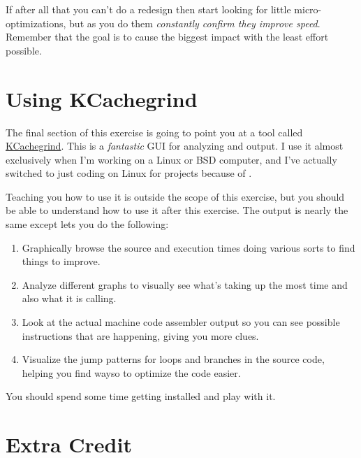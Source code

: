If after all that you can't do a redesign then start looking for little
micro-optimizations, but as you do them \emph{constantly confirm they
improve speed}.  Remember that the goal is to cause the biggest impact
with the least effort possible.

\section{Using KCachegrind}

The final section of this exercise is going to point you at a tool called 
\href{http://kcachegrind.sourceforge.net/html/Home.html}{KCachegrind}.  This
is a \emph{fantastic} GUI for analyzing  and 
output.  I use it almost exclusively when I'm working on a Linux or BSD computer,
and I've actually switched to just coding on Linux for projects because of 
.

Teaching you how to use it is outside the scope of this exercise, but you should
be able to understand how to use it after this exercise.  The output is nearly
the same except  lets you do the following:

\begin{enumerate}
\item Graphically browse the source and execution times doing various sorts to
    find things to improve.
\item Analyze different graphs to visually see what's taking up the most time
    and also what it is calling.
\item Look at the actual machine code assembler output so you can see possible
    instructions that are happening, giving you more clues.
\item Visualize the jump patterns for loops and branches in the source code,
    helping you find wayso to optimize the code easier.
\end{enumerate}

You should spend some time getting  installed and 
play with it.

\section{Extra Credit}

